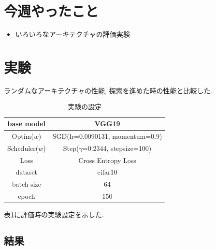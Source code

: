 \documentclass[twocolumn]{jarticle}     %
\begin{document}


\section{今週やったこと}
\begin{itemize}
  \item いろいろなアーキテクチャの評価実験
\end{itemize}

\section{実験}

ランダムなアーキテクチャの性能,
探索を進めた時の性能と比較した.

\begin{table}[tb]
  \begin{center}
    \caption{実験の設定}
    \begin{tabular}{|c|c|} \hline
      base model & VGG19 \\ \hline
      Optim($w$) & SGD(lr=0.0090131, momentum=0.9) \\ \hline
      Scheduler($w$) & Step($\gamma$=0.2344, stepsize=100) \\ \hline
      Loss & Cross Entropy Loss \\ \hline
      dataset & cifar10 \\ \hline
      batch size & 64 \\ \hline
      epoch & 150 \\ \hline
    \end{tabular}
    \label{tab:setting}
  \end{center}
\end{table}

表\ref{tab:setting}に評価時の実験設定を示した.


\subsection{結果}
\end{document}
